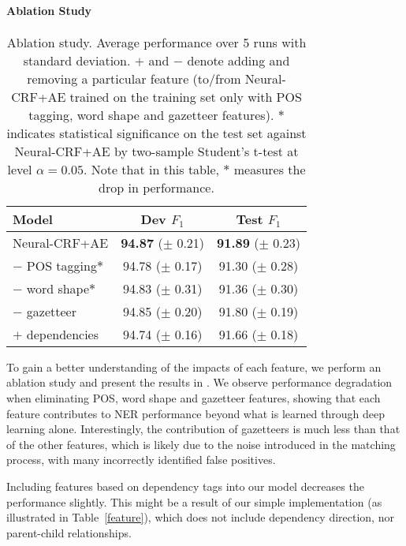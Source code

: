 \paragraph{Ablation Study}
\label{ssec:ablation}
\begin{table}[t]
\centering
\small
\begin{tabular}{lcc}
\toprule
Model                                            & Dev $F_1$ & Test $F_1$ \\
\midrule
Neural-CRF+AE & \textbf{94.87} ($\pm$ 0.21)   & \textbf{91.89} ($\pm$ 0.23)    \\
$-$ POS tagging$*$                                 & 94.78 ($\pm$ 0.17)   & 91.30 ($\pm$ 0.28)    \\
$-$ word shape$*$                                  & 94.83 ($\pm$ 0.31)   & 91.36 ($\pm$ 0.30)    \\
$-$ gazetteer                                    & 94.85 ($\pm$ 0.20)   & 91.80 ($\pm$ 0.19)    \\ 
$+$ dependencies                        & 94.74 ($\pm$ 0.16)   & 91.66 ($\pm$ 0.18)    \\
\bottomrule
\end{tabular}
\caption{Ablation study. Average performance over 5 runs with standard deviation. $+$ and $-$ denote adding and removing a particular feature (to/from Neural-CRF+AE trained on the training set only with POS tagging, word shape and gazetteer features). $*$ indicates statistical significance on the test set against Neural-CRF+AE by two-sample Student's t-test at level $\alpha=0.05$. Note that in this table, $*$ measures the drop in performance.}
\label{table4}
\end{table}

To gain a better understanding of the impacts of each feature, we perform an ablation study and present the results in .
We observe performance degradation when eliminating POS, word shape and gazetteer features, showing that each feature contributes to NER performance beyond what is learned through deep learning alone.
Interestingly, the contribution of gazetteers is much less than that of the other features, which is likely due to the noise introduced in the matching process, with many incorrectly identified false positives.

Including features based on dependency tags into our model decreases the performance slightly.
This might be a result of our simple implementation (as illustrated in Table~\ref{feature}), which does not include dependency direction, nor parent-child relationships.

